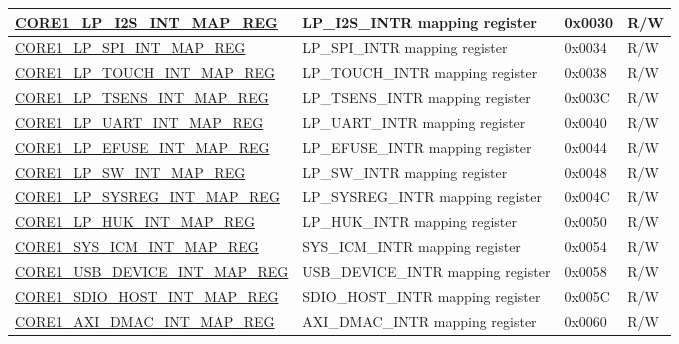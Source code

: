 \begin{longtable}{ | p{7.5cm} | p{7.2cm} | p{1.3cm} | p{1cm} | }
\hyperref[regdesc:CORE1LPI2SINTMAPREG]{CORE1\_LP\_I2S\_INT\_MAP\_REG} & LP\_I2S\_INTR mapping register & 0x0030 & R/W \\ \hline

\hyperref[regdesc:CORE1LPSPIINTMAPREG]{CORE1\_LP\_SPI\_INT\_MAP\_REG} & LP\_SPI\_INTR mapping register & 0x0034 & R/W \\ \hline

\hyperref[regdesc:CORE1LPTOUCHINTMAPREG]{CORE1\_LP\_TOUCH\_INT\_MAP\_REG} & LP\_TOUCH\_INTR mapping register & 0x0038 & R/W \\ \hline

\hyperref[regdesc:CORE1LPTSENSINTMAPREG]{CORE1\_LP\_TSENS\_INT\_MAP\_REG} & LP\_TSENS\_INTR mapping register & 0x003C & R/W \\ \hline

\hyperref[regdesc:CORE1LPUARTINTMAPREG]{CORE1\_LP\_UART\_INT\_MAP\_REG} & LP\_UART\_INTR mapping register & 0x0040 & R/W \\ \hline

\hyperref[regdesc:CORE1LPEFUSEINTMAPREG]{CORE1\_LP\_EFUSE\_INT\_MAP\_REG} & LP\_EFUSE\_INTR mapping register & 0x0044 & R/W \\ \hline

\hyperref[regdesc:CORE1LPSWINTMAPREG]{CORE1\_LP\_SW\_INT\_MAP\_REG} & LP\_SW\_INTR mapping register & 0x0048 & R/W \\ \hline

\hyperref[regdesc:CORE1LPSYSREGINTMAPREG]{CORE1\_LP\_SYSREG\_INT\_MAP\_REG} & LP\_SYSREG\_INTR mapping register & 0x004C & R/W \\ \hline

\hyperref[regdesc:CORE1LPHUKINTMAPREG]{CORE1\_LP\_HUK\_INT\_MAP\_REG} & LP\_HUK\_INTR mapping register & 0x0050 & R/W \\ \hline

\hyperref[regdesc:CORE1SYSICMINTMAPREG]{CORE1\_SYS\_ICM\_INT\_MAP\_REG} & SYS\_ICM\_INTR mapping register & 0x0054 & R/W \\ \hline

\hyperref[regdesc:CORE1USBDEVICEINTMAPREG]{CORE1\_USB\_DEVICE\_INT\_MAP\_REG} & USB\_DEVICE\_INTR mapping register & 0x0058 & R/W \\ \hline

\hyperref[regdesc:CORE1SDIOHOSTINTMAPREG]{CORE1\_SDIO\_HOST\_INT\_MAP\_REG} & SDIO\_HOST\_INTR mapping register & 0x005C & R/W \\ \hline

\hyperref[regdesc:CORE1AXIDMACINTMAPREG]{CORE1\_AXI\_DMAC\_INT\_MAP\_REG} & AXI\_DMAC\_INTR mapping register & 0x0060 & R/W \\ \hline


\end{longtable}
